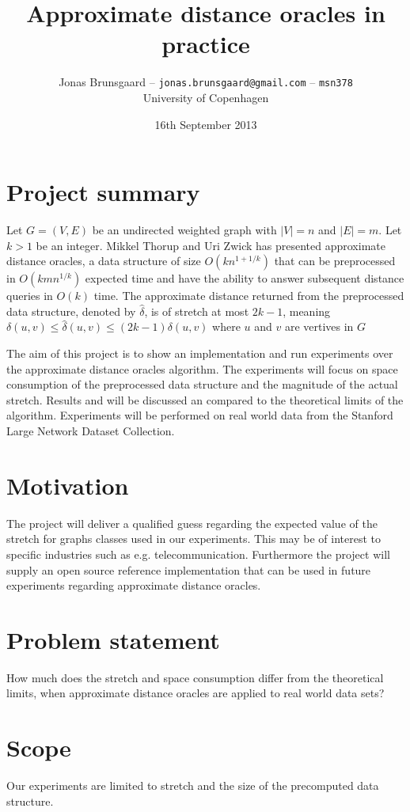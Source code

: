 \documentclass[10pt,a4paper,final,oneside,openany,article]{memoir}
\title{Approximate distance oracles in practice}
\author{
  Jonas Brunsgaard -- \texttt{jonas.brunsgaard@gmail.com} -- \texttt{msn378} \\
  University of Copenhagen
}
\date{16th September 2013}
\begin{document}
\maketitle

\chapter{Project summary}
Let $G = (V, E)$ be an undirected weighted graph with $|V| = n$ and
$|E| = m$. Let $k > 1$ be an integer. Mikkel Thorup and Uri Zwick has
presented approximate distance oracles\cite{tu}, a data structure of size
$O(kn^{1+1/k})$ that can be preprocessed in $O(kmn^{1/k})$ expected time and
have the ability to answer subsequent distance queries in $O(k)$ time.
The approximate distance returned from the preprocessed data structure, denoted
by $\hat{\delta}$, is of stretch at most $2k-1$, meaning $\delta(u,v)\leq
\hat{\delta}(u,v)\leq(2k-1)\delta(u,v)$ where $u$ and $v$ are vertives in $G$

The aim of this project is to show an implementation and run experiments over
the approximate distance oracles algorithm. The experiments will focus on
space consumption of the preprocessed data structure and the magnitude of the
actual stretch. Results and will be discussed an compared to the theoretical
limits of the algorithm. Experiments will be performed on real world data from
the Stanford Large Network Dataset Collection.

\chapter{Motivation}
The project will deliver a qualified guess regarding the expected value of the
stretch for graphs classes used in our experiments. This may be of interest to
specific industries such as e.g. telecommunication.
Furthermore the project will supply an open source reference implementation
that can be used in future experiments regarding approximate distance oracles.

\chapter{Problem statement}
How much does the stretch and space consumption differ from the theoretical
limits, when approximate distance oracles are applied to real world data sets?

\chapter{Scope}
Our experiments are limited to stretch and the size of the precomputed data
structure.
\end{document}
